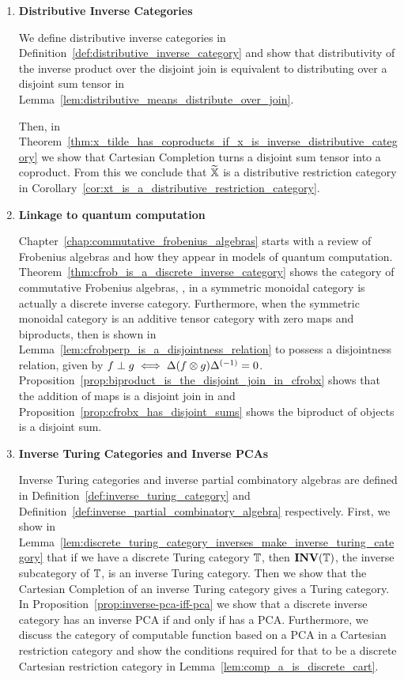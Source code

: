 \begin{enumerate}
\item \textbf{Distributive Inverse Categories}

We define distributive inverse categories in Definition~\ref{def:distributive_inverse_category} and
show that distributivity of the inverse product over the disjoint join is equivalent to distributing
over a disjoint sum tensor in Lemma~\ref{lem:distributive_means_distribute_over_join}.

Then, in Theorem~\ref{thm:x_tilde_has_coproducts_if_x_is_inverse_distributive_category} we show that
Cartesian Completion turns a disjoint sum tensor into a coproduct. From this we conclude that $\widetilde{\mathbb{X}}$
is a distributive restriction category in
Corollary~\ref{cor:xt_is_a_distributive_restriction_category}.

\item \textbf{Linkage to quantum computation}

Chapter~\ref{chap:commutative_frobenius_algebras} starts with a review of Frobenius algebras and how
they appear in models of quantum computation. Theorem~\ref{thm:cfrob_is_a_discrete_inverse_category}
shows the category of commutative Frobenius algebras, \CFrob, in a symmetric monoidal category \X
is actually a discrete inverse category. Furthermore, when the symmetric monoidal category \X is an
additive tensor category with zero maps and biproducts, then \CFrob is shown in
Lemma~\ref{lem:cfrobperp_is_a_disjointness_relation} to possess a disjointness relation, given by
$f\perp g \iff \Delta(f\otimes g){\Delta}^{(-1)} =
0$. Proposition~\ref{prop:biproduct_is_the_disjoint_join_in_cfrobx} shows that the addition of maps
is a disjoint join in \CFrob and Proposition~\ref{prop:cfrobx_has_disjoint_sums} shows the
biproduct of objects is a disjoint sum.

\item \textbf{Inverse Turing Categories and Inverse PCAs}

Inverse Turing categories and inverse partial combinatory algebras are defined in
Definition~\ref{def:inverse_turing_category} and
Definition~\ref{def:inverse_partial_combinatory_algebra} respectively. First, we show in
Lemma~\ref{lem:discrete_turing_category_inverses_make_inverse_turing_category} that if we have a
discrete Turing category $\mathbb{T}$, then $\mathbf{INV}({\mathbb{T}})$, the inverse subcategory of $\mathbb{T}$, is an inverse Turing
category. Then we show that the Cartesian Completion of an inverse Turing category gives a Turing
category. In Proposition~\ref{prop:inverse-pca-iff-pca} we show that a discrete inverse category \X
has an inverse PCA if and only if \Xt has a PCA. Furthermore, we discuss the category of computable
function based on a PCA in a Cartesian restriction category and show the conditions required for
that to be a discrete Cartesian restriction category in Lemma~\ref{lem:comp_a_is_discrete_cart}.
\end{enumerate}

